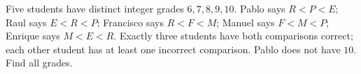 Five students have distinct integer grades $6,7,8,9,10$. Pablo says $R<P<E$; Raul says $E<R<P$; Francisco says $R<F<M$; Manuel says $F<M<P$; Enrique says $M<E<R$. Exactly three students have both comparisons correct; each other student has at least one incorrect comparison. Pablo does not have $10$. Find all grades.
